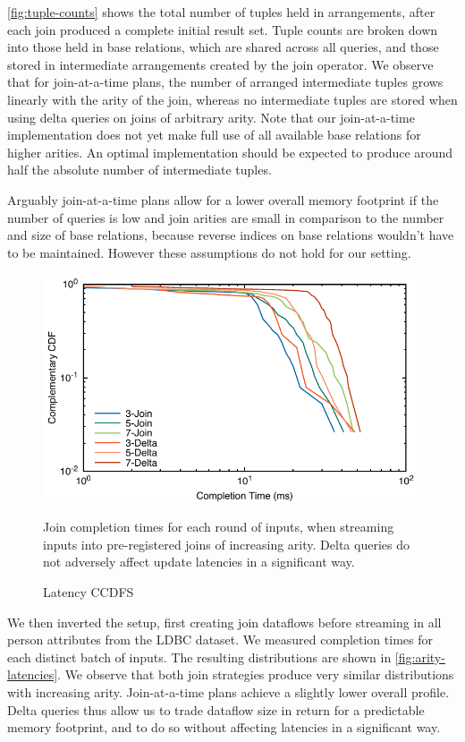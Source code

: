 \documentclass[../catalog.tex]{subfiles}
\begin{document}
\autoref{fig:tuple-counts} shows the total number of tuples held in
arrangements, after each join produced a complete initial result
set. Tuple counts are broken down into those held in base relations,
which are shared across all queries, and those stored in intermediate
arrangements created by the join operator. We observe that for
join-at-a-time plans, the number of arranged intermediate tuples grows
linearly with the arity of the join, whereas no intermediate tuples
are stored when using delta queries on joins of arbitrary arity. Note
that our join-at-a-time implementation does not yet make full use of
all available base relations for higher arities. An optimal
implementation should be expected to produce around half the absolute
number of intermediate tuples.

Arguably join-at-a-time plans allow for a lower overall memory
footprint if the number of queries is low and join arities are small
in comparison to the number and size of base relations, because
reverse indices on base relations wouldn't have to be
maintained. However these assumptions do not hold for our setting.

\begin{figure}[h!]
  \includegraphics[width=1.0\linewidth]{results/join-state/out/all_cdfs}
  \caption{Latency CCDFS}
  \label{fig:arity-latencies}
  \medskip
  \small

  Join completion times for each round of inputs, when streaming
  inputs into pre-registered joins of increasing arity. Delta queries
  do not adversely affect update latencies in a significant way.
\end{figure}

We then inverted the setup, first creating join dataflows before
streaming in all person attributes from the LDBC dataset. We measured
completion times for each distinct batch of inputs. The resulting
distributions are shown in \autoref{fig:arity-latencies}. We observe
that both join strategies produce very similar distributions with
increasing arity. Join-at-a-time plans achieve a slightly lower
overall profile. Delta queries thus allow us to trade dataflow size in
return for a predictable memory footprint, and to do so without
affecting latencies in a significant way.
\end{document}
